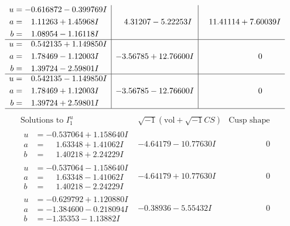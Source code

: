 \documentclass[1p]{elsarticle_modified}
\theoremstyle{definition}
\newcommand{\I}{\sqrt{-1}}
\begin{document}
$$\begin{array}{c|c|c}
\begin{aligned}
u &= -0.616872 - 0.399769 I \\
a &= \phantom{-}1.11263 + 1.45968 I \\
b &= \phantom{-}1.08954 - 1.16118 I\end{aligned}
 & \phantom{-}4.31207 - 5.22253 I & \phantom{-}11.41114 + 7.60039 I \\ \hline\begin{aligned}
u &= \phantom{-}0.542135 + 1.149850 I \\
a &= \phantom{-}1.78469 - 1.12003 I \\
b &= \phantom{-}1.39724 - 2.59801 I\end{aligned}
 & -3.56785 + 12.76600 I & \phantom{-0.000000 } 0 \\ \hline\begin{aligned}
u &= \phantom{-}0.542135 - 1.149850 I \\
a &= \phantom{-}1.78469 + 1.12003 I \\
b &= \phantom{-}1.39724 + 2.59801 I\end{aligned}
 & -3.56785 - 12.76600 I & \phantom{-0.000000 } 0\\
 \hline 
 \end{array}$$\newpage$$\begin{array}{c|c|c}  
\text{Solutions to }I^u_{1}& \I (\text{vol} + \sqrt{-1}CS) & \text{Cusp shape}\\
 \hline 
\begin{aligned}
u &= -0.537064 + 1.158640 I \\
a &= \phantom{-}1.63348 + 1.41062 I \\
b &= \phantom{-}1.40218 + 2.24229 I\end{aligned}
 & -4.64179 - 10.77630 I & \phantom{-0.000000 } 0 \\ \hline\begin{aligned}
u &= -0.537064 - 1.158640 I \\
a &= \phantom{-}1.63348 - 1.41062 I \\
b &= \phantom{-}1.40218 - 2.24229 I\end{aligned}
 & -4.64179 + 10.77630 I & \phantom{-0.000000 } 0 \\ \hline\begin{aligned}
u &= -0.629792 + 1.120880 I \\
a &= -1.384600 - 0.218094 I \\
b &= -1.35353 - 1.13882 I\end{aligned}
 & -0.38936 - 5.55432 I & \phantom{-0.000000 } 0 \\ \hline\begin{aligned}

\end{aligned}
\end{array}$$
\end{document}
